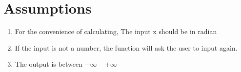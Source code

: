 \documentclass[10pt,a4paper,twoside]{article}
\begin{document}
\section{Assumptions}

\begin{enumerate}
\item 
For the convenience of calculating, The input x should be in radian
\item
If the input is not a number, the function will ask the user to input again.
\item
The output is between $-\infty$ ~  $+\infty$
\end{enumerate}
\end{document}
